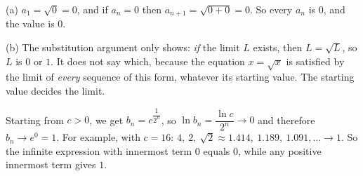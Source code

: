 (a) $a_1=\sqrt0=0$, and if $a_n=0$ then $a_{n+1}=\sqrt{0+0}=0$. So every $a_n$ is $0$, and the value is $\boxed{0}$.

(b) The substitution argument only shows: \emph{if} the limit $L$ exists, then $L=\sqrt L$, so $L$ is $0$ or $1$. It does not say which, because the equation $x=\sqrt x$ is satisfied by the limit of \emph{every} sequence of this form, whatever its starting value. The starting value decides the limit.

Starting from $c>0$, we get $b_n=c^{\dfrac{1}{2^n}}$, so $\ln b_n=\dfrac{\ln c}{2^n}\to0$ and therefore $b_n\to e^0=1$. For example, with $c=16$: $4,\ 2,\ \sqrt2\approx1.414,\ 1.189,\ 1.091,\dots\to1$. So the infinite expression with innermost term $0$ equals $0$, while any positive innermost term gives $1$.
